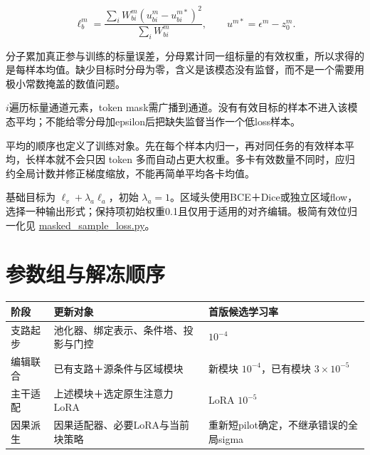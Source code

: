 \[
\ell_b^m=\frac{\sum_i W_{bi}^m
(u_{bi}^m-u_{bi}^{m*})^2}{\sum_i W_{bi}^m},
\qquad u^{m*}=\epsilon^m-z_0^m.
\]

分子累加真正参与训练的标量误差，分母累计同一组标量的有效权重，所以求得的是每样本均值。缺少目标时分母为零，含义是该模态没有监督，而不是一个需要用极小常数掩盖的数值问题。

\(i\)遍历标量通道元素，token mask需广播到通道。没有有效目标的样本不进入该模态平均；不能给零分母加epsilon后把缺失监督当作一个低loss样本。

平均的顺序也定义了训练对象。先在每个样本内归一，再对同任务的有效样本平均，长样本就不会只因 token 多而自动占更大权重。多卡有效数量不同时，应归约全局计数并修正梯度缩放，不能再简单平均各卡均值。

基础目标为 \(\ell_v+\lambda_a\ell_a\)，初始 \(\lambda_a=1\)。区域头使用BCE＋Dice或独立区域flow，选择一种输出形式；保持项初始权重0.1且仅用于适用的对齐编辑。极简有效位归一化见 \hyperref[code-masked-sample-loss]{masked\_sample\_loss.py}。

\section{参数组与解冻顺序}\label{seedance-m25-ux53c2ux6570ux7ec4ux4e0eux89e3ux51bbux987aux5e8f}

{\def\LTcaptype{table} %
\small\setlength{\tabcolsep}{3pt}\renewcommand{\arraystretch}{1.18}
\begin{longtable}[]{@{}
  >{\raggedright\arraybackslash}p{}
  >{\raggedright\arraybackslash}p{}
  >{\raggedleft\arraybackslash}p{}@{}}
\toprule\noalign{}
\begin{minipage}[b]{\linewidth}\raggedright
阶段
\end{minipage} & \begin{minipage}[b]{\linewidth}\raggedright
更新对象
\end{minipage} & \begin{minipage}[b]{\linewidth}\raggedleft
首版候选学习率
\end{minipage} \\
\midrule\noalign{}
\endhead
\bottomrule\noalign{}
\endlastfoot
支路起步 & 池化器、绑定表示、条件塔、投影与门控 & \(10^{-4}\) \\
编辑联合 & 已有支路＋源条件与区域模块 & 新模块 \(10^{-4}\)，已有模块 \(3\times10^{-5}\) \\
主干适配 & 上述模块＋选定原生注意力LoRA & LoRA \(10^{-5}\) \\
因果派生 & 因果适配器、必要LoRA与当前块策略 & 重新短pilot确定，不继承错误的全局sigma \\
\end{longtable}
}

